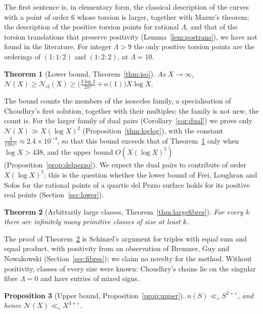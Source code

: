 \documentclass[11pt]{amsart}
\newtheorem{introthm}{Theorem}
\newtheorem{introprop}[introthm]{Proposition}
\theoremstyle{definition}
\theoremstyle{remark}
\newcommand{\N}{\mathcal{N}}
\newcommand{\Ncl}{\mathcal{N}_{\mathrm{cl}}}
\begin{document}
The first sentence is, in elementary form, the classical description of the curves with a point of order $6$ whose torsion is larger, together with Mazur's theorem; the description of the positive torsion points for rational $\Lambda$, and that of the torsion translations that preserve positivity (Lemma~\ref{lem:postrans}), we have not found in the literature. For integer $\Lambda>9$ the only positive torsion points are the orderings of $(1:1:2)$ and $(1:2:2)$, at $\Lambda=10$.

\begin{introthm}[Lower bound, Theorem~\ref{thm:iso}]\label{thm:A}
As $X\to\infty$, $\N(X)\ge\Ncl(X)\ge\big(\frac{3\log2}{2\pi^2}+o(1)\big)X\log X$.
\end{introthm}

The bound counts the members of the isosceles family, a specialisation of Choudhry's first solution, together with their multiples; the family is not new, the count is. For the larger family of dual pairs (Corollary~\ref{cor:dual}) we prove only $\N(X)\gg X(\log X)^2$ (Proposition~\ref{thm:loglog}), with the constant $\frac3{128\pi^4}\approx2.4\times10^{-4}$, so that this bound exceeds that of Theorem~\ref{thm:A} only when $\log X>438$, and the upper bound $O(X(\log X)^5)$ (Proposition~\ref{prop:delpezzo}). We expect the dual pairs to contribute of order $X(\log X)^5$; this is the question whether the lower bound of Frei, Loughran and Sofos for the rational points of a quartic del Pezzo surface holds for its positive real points (Section~\ref{sec:lower}).

\begin{introthm}[Arbitrarily large classes, Theorem~\ref{thm:largefibres}]\label{thm:B}
For every $k$ there are infinitely many primitive classes of size at least $k$.
\end{introthm}

The proof of Theorem~\ref{thm:B} is Schinzel's argument for triples with equal sum and equal product, with positivity from an observation of Bremner, Guy and Nowakowski (Section~\ref{sec:fibres}); we claim no novelty for the method. Without positivity, classes of every size were known: Choudhry's chains \cite[\S5.1, (52)--(55)]{choudhry2011} lie on the singular fibre $\Lambda=0$ and have entries of mixed signs.

\begin{introprop}[Upper bound, Proposition~\ref{prop:upper}]\label{prop:C}
$n(S)\ll_\varepsilon S^{2+\varepsilon}$, and hence $\N(X)\ll_\varepsilon X^{3+\varepsilon}$.
\end{introprop}
\end{document}

